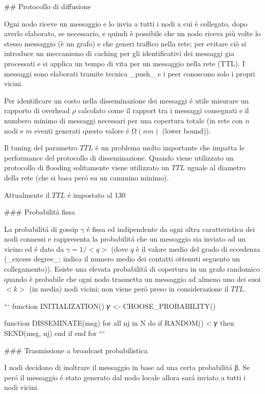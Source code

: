 ## Protocollo di diffusione

Ogni nodo riceve un messaggio e lo invia a tutti i nodi a cui è collegato, dopo averlo elaborato, se necessario, e quindi è possibile che un nodo riceva più volte lo stesso messaggio (è un grafo) e che generi traffico nella rete; per evitare ciò si introduce un meccanismo di caching per gli identificativi dei messaggi gia processati e si applica un tempo di vita per un messaggio nella rete (TTL). I messaggi sono elaborati tramite tecnica \_push\_ e i peer conoscono solo i propri vicini.

Per identificare un costo nella disseminazione dei messaggi é utile misurare un rapporto di overhead $ρ$ calcolato come il rapport tra i messaggi consegnati e il numbero minimo di messaggi necessari per una copertura totale (in rete con $n$ nodi e $m$ eventi generati questo valore é $Ω(nm)$ (lower bound)).

Il tuning del parametro $TTL$ é un problema molto importante che impatta le performance del protocollo di disseminazione. Quando viene utilizzato un protocollo di flooding solitamente viene utilizzato un $TTL$ uguale al diametro della rete (che si basa peró su un cammino minimo).

Attualmente il $TTL$ é impostato al 130%

### Probabilitá fissa

La probabilitá di gossip $𝛾$ é fissa ed indipendente da ogni altra caratteristica dei nodi connessi e rappresenta la probabilitá che un messaggio sia inviato ad un vicino ed é dato da $𝛾 = 1/<q>$ (dove $q$ è il valore medio del grado di eccedenza (\_excess degree\_: indica il numero medio dei contatti ottenuti seguento un collegamento)). Esiste una elevata probabilitá di copertura in un grafo randomico quando è probabile che ogni nodo trasmetta un messaggio ad almeno uno dei suoi $<k>$ (in media) nodi vicini; non viene peró preso in considerazione il $TTL$.

```
function INITIALIZATION()
    𝛾 <- CHOOSE\_PROBABILITY()

function DISSEMINATE(msg)
    for all nj in N do
        if RANDOM() < 𝛾 then
            SEND(msg, nj)
        end if
    end for
```

### Trasmissione a broadcast probabilistica

I nodi decidono di inoltrare il messaggio in base ad una certa probabilitá β. Se peró il messaggio é stato generato dal nodo locale allora sará inviato a tutti i nodi vicini.

